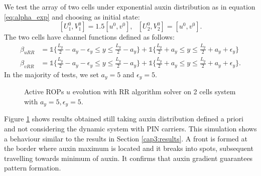 We test the array of two cells under exponential auxin distribution as in equation \eqref{eq:alpha_exp} and choosing as initial state:
\begin{equation}
  \left[ U_1^0, V_1^0 \right] = 1.5 \left[u^0,v^0 \right], \ \ \ \left[ U_2^0, V_2^0 \right] = \left[u^0,v^0 \right].
\end{equation}
The two cells have channel functions defined as follows:
\begin{equation}\label{eq:betaY}\begin{aligned}
    \beta_{uRR} & = \mathbb{1} \Big\{ \frac{L_y}{2} - a_y - \epsilon_y \leq y \leq \frac{L_y}{2} - a_y \Big\}
    + \mathbb{1} \Big\{\frac{L_y}{2} + a_y \leq y \leq \frac{L_y}{2} + a_y + \epsilon_y \Big\} \\
    \beta_{vRR} & = \mathbb{1} \Big\{ \frac{L_y}{2} - a_y - \epsilon_y \leq y \leq \frac{L_y}{2} - a_y \Big\}
    + \mathbb{1} \Big\{\frac{L_y}{2} + a_y \leq y \leq \frac{L_y}{2} + a_y + \epsilon_y \Big\}.
\end{aligned}\end{equation}
In the majority of tests, we set $a_y = 5$ and $\epsilon_y = 5$.
\begin{figure}[H]
    \centering
    \quad
    \quad
    \quad
    \quad
    \quad
    \quad
    \caption[2cell RR Active ROPs - with $a_y = 5 , \epsilon_y = 5$]{Active ROPs $u$ evolution with RR algorithm solver on 2 cells system with $a_y = 5 , \epsilon_y = 5$.}
    \label{fig:UH5}
\end{figure}
Figure \ref{fig:UH5} shows results obtained still taking auxin distribution defined a priori and not considering the dynamic system with PIN carriers. This simulation shows a behaviour similar to the results in Section \ref{cap3:results}. A front is formed at the border where auxin maximum is located and it breaks into spots, subsequent travelling towards minimum of auxin. It confirms that auxin gradient guarantees pattern formation.

